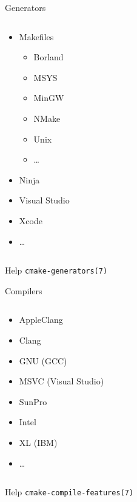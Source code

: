 \documentclass{beamer}
\begin{document}
\begin{frame}{Generators}
    \begin{columns}[T]
        \begin{column}{0.4\textwidth}
            \begin{itemize}
                \item Makefiles
                    \begin{itemize}
                        \item Borland
                        \item MSYS
                        \item MinGW
                        \item NMake
                        \item Unix
                        \item …
                    \end{itemize}
                \item Ninja
                \item Visual Studio
                \item Xcode
                \item …
            \end{itemize}
        \end{column}
        \begin{column}{0.6\textwidth}
        \end{column}
    \end{columns}

    \begin{block}{Help}
        \texttt{cmake-generators(7)}
    \end{block}
\end{frame}

\begin{frame}{Compilers}
    \begin{columns}[T]
        \begin{column}{0.5\textwidth}
            \begin{itemize}
                \item AppleClang
                \item Clang
                \item GNU (GCC)
                \item MSVC (Visual Studio)
                \item SunPro
                \item Intel
                \item XL (IBM)
                \item …
            \end{itemize}
        \end{column}
        \begin{column}{0.5\textwidth}
        \end{column}
    \end{columns}

    \begin{block}{Help}
        \texttt{cmake-compile-features(7)}
    \end{block}
\end{frame}
\end{document}
